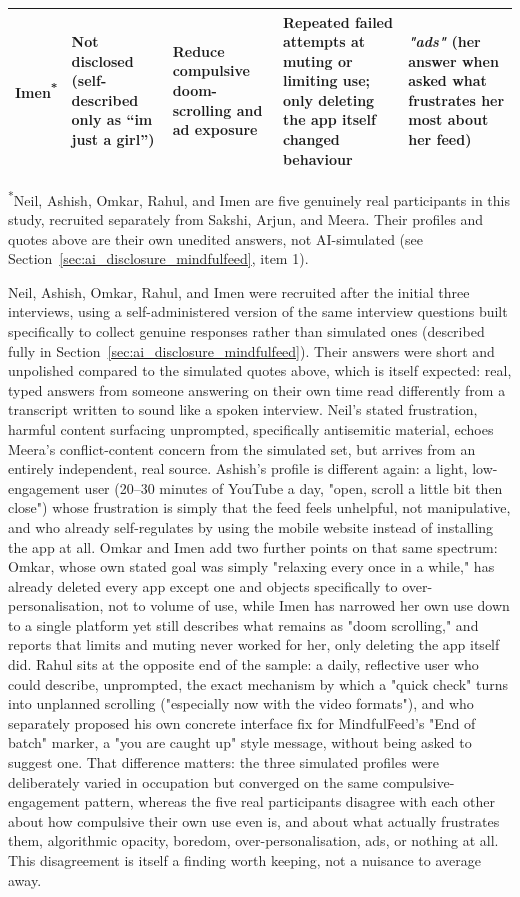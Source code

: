 \documentclass[11pt]{article}
\begin{document}
\begin{table}[h]
\begin{tabular}{p{1.8cm}p{2.6cm}p{3.2cm}p{3.2cm}p{5.5cm}}
Imen\textsuperscript{*} & Not disclosed (self-described only as ``im just a girl'') & Reduce compulsive doom-scrolling and ad exposure & Repeated failed attempts at muting or limiting use; only deleting the app itself changed behaviour & \textit{"ads"} (her answer when asked what frustrates her most about her feed) \\
\hline
\end{tabular}
\end{table}

\textsuperscript{*}Neil, Ashish, Omkar, Rahul, and Imen are five genuinely real participants in this study, recruited separately from Sakshi, Arjun, and Meera. Their profiles and quotes above are their own unedited answers, not AI-simulated (see Section~\ref{sec:ai_disclosure_mindfulfeed}, item 1).

Neil, Ashish, Omkar, Rahul, and Imen were recruited after the initial three interviews, using a self-administered version of the same interview questions built specifically to collect genuine responses rather than simulated ones (described fully in Section~\ref{sec:ai_disclosure_mindfulfeed}). Their answers were short and unpolished compared to the simulated quotes above, which is itself expected: real, typed answers from someone answering on their own time read differently from a transcript written to sound like a spoken interview. Neil's stated frustration, harmful content surfacing unprompted, specifically antisemitic material, echoes Meera's conflict-content concern from the simulated set, but arrives from an entirely independent, real source. Ashish's profile is different again: a light, low-engagement user (20--30 minutes of YouTube a day, "open, scroll a little bit then close") whose frustration is simply that the feed feels unhelpful, not manipulative, and who already self-regulates by using the mobile website instead of installing the app at all. Omkar and Imen add two further points on that same spectrum: Omkar, whose own stated goal was simply "relaxing every once in a while," has already deleted every app except one and objects specifically to over-personalisation, not to volume of use, while Imen has narrowed her own use down to a single platform yet still describes what remains as "doom scrolling," and reports that limits and muting never worked for her, only deleting the app itself did. Rahul sits at the opposite end of the sample: a daily, reflective user who could describe, unprompted, the exact mechanism by which a "quick check" turns into unplanned scrolling ("especially now with the video formats"), and who separately proposed his own concrete interface fix for MindfulFeed's "End of batch" marker, a "you are caught up" style message, without being asked to suggest one. That difference matters: the three simulated profiles were deliberately varied in occupation but converged on the same compulsive-engagement pattern, whereas the five real participants disagree with each other about how compulsive their own use even is, and about what actually frustrates them, algorithmic opacity, boredom, over-personalisation, ads, or nothing at all. This disagreement is itself a finding worth keeping, not a nuisance to average away.
\end{document}
